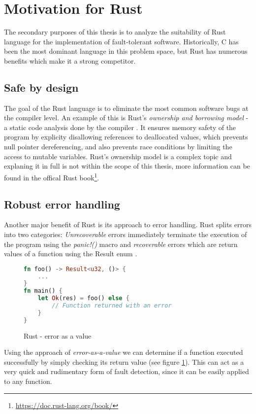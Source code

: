 \section{Motivation for Rust}
The secondary purposes of this thesis is to analyze the suitability of Rust language for the implementation of fault-tolerant software. Historically, C has been the most dominant language in this problem space, but Rust has numerous benefits which make it a strong competitor.

\subsection{Safe by design}
The goal of the Rust language is to eliminate the most common software bugs at the compiler level. An example of this is Rust's \textit{ownership and borrowing model} - a static code analysis done by the compiler \cite{rust_book:ownership}. It ensures memory safety of the program by explicity disallowing references to deallocated values, which prevents null pointer dereferencing, and also prevents race conditions by limiting the access to mutable variables. Rust's ownership model is a complex topic and explaning it in full is not within the scope of this thesis, more information can be found in the offical Rust book\footnote{\url{https://doc.rust-lang.org/book/}}.

\subsection{Robust error handling}
Another major benefit of Rust is its approach to error handling. Rust splits errors into two categories: \textit{Unrecoverable} errors immediately terminate the execution of the program using the \textit{panic!()} macro and \textit{recoverable} errors which are return values of a function using the Result enum \cite{rust_book:error_handling}.

\begin{figure}[!h]
\begin{lstlisting}[language=Rust]
fn foo() -> Result<u32, ()> {
    ...
}
fn main() {
    let Ok(res) = foo() else {
        // Function returned with an error
    }
}
\end{lstlisting}
\caption{Rust - error as a value}
\label{fig:rust_error}
\end{figure}

Using the approach of \textit{error-as-a-value} we can determine if a function executed successfully by simply checking its return value (see figure \ref{fig:rust_error}). This can act as a very quick and rudimentary form of fault detection, since it can be easily applied to any function.

